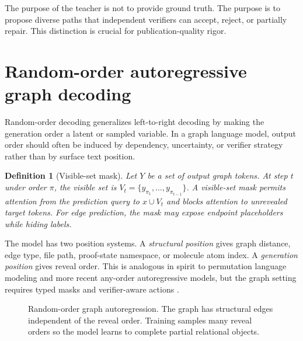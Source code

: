 \documentclass[11pt]{article}
\newtheorem{definition}{Definition}[section]
\newcommand{\1}{\mathbf{1}}
\begin{document}
The purpose of the teacher is not to provide ground truth. The purpose is to propose diverse paths that independent verifiers can accept, reject, or partially repair. This distinction is crucial for publication-quality rigor.

\section{Random-order autoregressive graph decoding}
\label{sec:random-order-decoding}

Random-order decoding generalizes left-to-right decoding by making the generation order a latent or sampled variable. In a graph language model, output order should often be induced by dependency, uncertainty, or verifier strategy rather than by surface text position.

\begin{definition}[Visible-set mask]
Let $Y$ be a set of output graph tokens. At step $t$ under order $\pi$, the visible set is $V_t=\{y_{\pi_1},\ldots,y_{\pi_{t-1}}\}$. A visible-set mask permits attention from the prediction query to $x\cup V_t$ and blocks attention to unrevealed target tokens. For edge prediction, the mask may expose endpoint placeholders while hiding labels.
\end{definition}

The model has two position systems. A \emph{structural position} gives graph distance, edge type, file path, proof-state namespace, or molecule atom index. A \emph{generation position} gives reveal order. This is analogous in spirit to permutation language modeling and more recent any-order autoregressive models, but the graph setting requires typed masks and verifier-aware actions \cite{XLNet2019,SigmaGPT2024,RandAR2025}.

\begin{figure}[H]
\centering
{}
\caption{Random-order graph autoregression. The graph has structural edges independent of the reveal order. Training samples many reveal orders so the model learns to complete partial relational objects.}
\label{fig:random-order-graph}
\end{figure}
\end{document}
